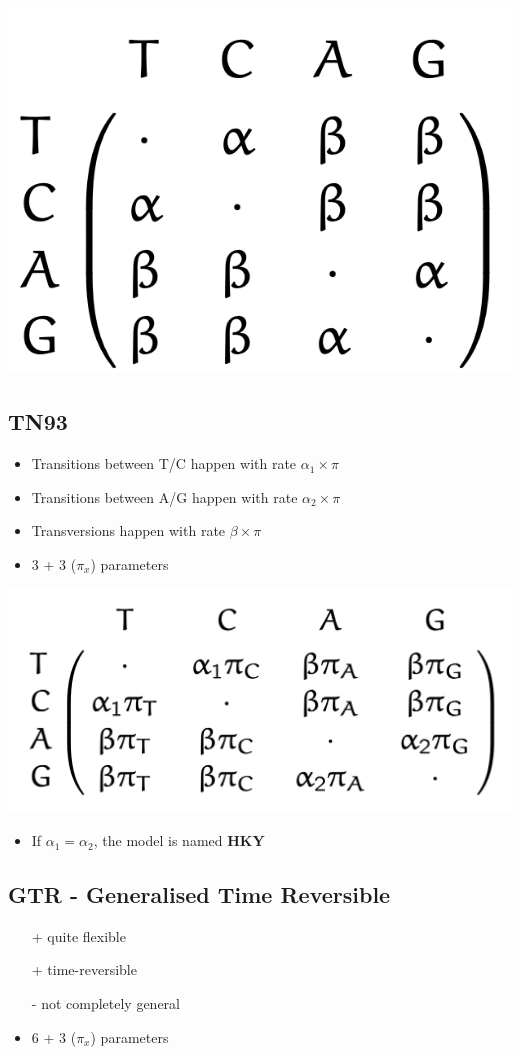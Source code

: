 \documentclass{article}
\begin{document}
\begin{multicols*}{3}
\begin{center}
    \includegraphics[width=0.5\linewidth]{k80.png}
\end{center}

\subsection{TN93}
\begin{itemize}
    \item Transitions between T/C happen with rate $\alpha_1 \times \pi$
    \item Transitions between A/G happen with rate $\alpha_2 \times \pi$
    \item Transversions happen with rate $\beta\times \pi$
    \item 3 + 3 ($\pi_x$) parameters 
\end{itemize}

\begin{center}
    \includegraphics[width=0.7\linewidth]{tn93.png}
\end{center}

\begin{itemize}
    \item If $\alpha_1 = \alpha_2$, the model is named \textbf{HKY}
\end{itemize}

\subsection{GTR - Generalised Time Reversible}

\begin{itemize}
    \item[+] quite flexible
    \item[+] time-reversible
    \item[-] not completely general
    \item 6 + 3 ($\pi_x$) parameters 
\end{itemize}


\end{multicols*}
\end{document}
